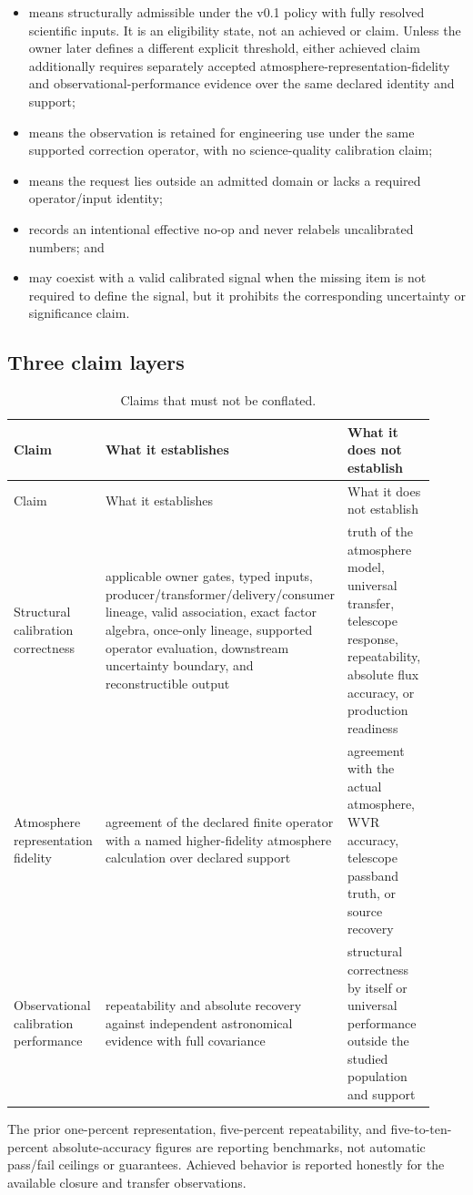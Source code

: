 \begin{itemize}
\item {} means structurally admissible
  under the v0.1 policy with fully resolved scientific inputs. It is an
  eligibility state, not an achieved  or
   claim. Unless the owner later defines a different
  explicit threshold, either achieved claim additionally requires separately
  accepted atmosphere-representation-fidelity and observational-performance
  evidence over the same declared identity and support;
\item {} means the observation is retained for
  engineering use under the same supported correction operator, with no
  science-quality calibration claim;
\item {} means the request lies outside an
  admitted domain or lacks a required operator/input identity;
\item {} records an intentional effective no-op and
  never relabels uncalibrated numbers; and
\item {} may coexist with a valid calibrated
  signal when the missing item is not required to define the signal, but it
  prohibits the corresponding uncertainty or significance claim.
\end{itemize}

\subsection{Three claim layers}
\label{sec:claim-layers}

\begin{longtable}{L{0.22\linewidth}L{0.34\linewidth}L{0.36\linewidth}}
\caption{Claims that must not be conflated.}\label{tab:claim-layers}\\
\toprule
Claim & What it establishes & What it does not establish \\
\midrule
\endfirsthead
\toprule
Claim & What it establishes & What it does not establish \\
\midrule
\endhead
Structural calibration correctness & applicable owner gates, typed inputs, producer/transformer/delivery/consumer lineage, valid association, exact factor algebra, once-only lineage, supported operator evaluation, downstream uncertainty boundary, and reconstructible output & truth of the atmosphere model, universal transfer, telescope response, repeatability, absolute flux accuracy, or production readiness \\
Atmosphere representation fidelity & agreement of the declared finite operator with a named higher-fidelity atmosphere calculation over declared support & agreement with the actual atmosphere, WVR accuracy, telescope passband truth, or source recovery \\
Observational calibration performance & repeatability and absolute recovery against independent astronomical evidence with full covariance & structural correctness by itself or universal performance outside the studied population and support \\
\bottomrule
\end{longtable}

The prior one-percent representation, five-percent repeatability, and
five-to-ten-percent absolute-accuracy figures are reporting benchmarks, not
automatic pass/fail ceilings or guarantees. Achieved behavior is reported
honestly for the available closure and transfer observations.
